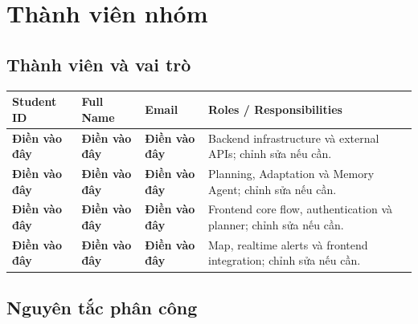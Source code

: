 \documentclass[12pt,a4paper]{article}
\newcommand{\dienvao}{\textbf{Điền vào đây}}
\begin{document}
\newpage
\pagestyle{fancy}
\setcounter{page}{1}
\renewcommand{\contentsname}{\centerline{MỤC LỤC}}
\tableofcontents
\newpage

\renewcommand{\listfigurename}{\centerline{DANH SÁCH HÌNH ẢNH}}
\listoffigures
\newpage

\renewcommand{\listtablename}{\centerline{DANH SÁCH BẢNG BIỂU}}
\listoftables
\newpage

\setcounter{page}{1}

\section{Thành viên nhóm}

\subsection{Thành viên và vai trò}

\begin{longtable}{|C{2.5cm}|C{3.5cm}|C{4.0cm}|C{5.0cm}|}
\hline
\textbf{Student ID} & \textbf{Full Name} & \textbf{Email} & \textbf{Roles / Responsibilities} \\ \hline
\endhead
\dienvao & \dienvao & \dienvao & Backend infrastructure và external APIs; chỉnh sửa nếu cần. \\ \hline
\dienvao & \dienvao & \dienvao & Planning, Adaptation và Memory Agent; chỉnh sửa nếu cần. \\ \hline
\dienvao & \dienvao & \dienvao & Frontend core flow, authentication và planner; chỉnh sửa nếu cần. \\ \hline
\dienvao & \dienvao & \dienvao & Map, realtime alerts và frontend integration; chỉnh sửa nếu cần. \\ \hline
\end{longtable}

\subsection{Nguyên tắc phân công}
\end{document}

